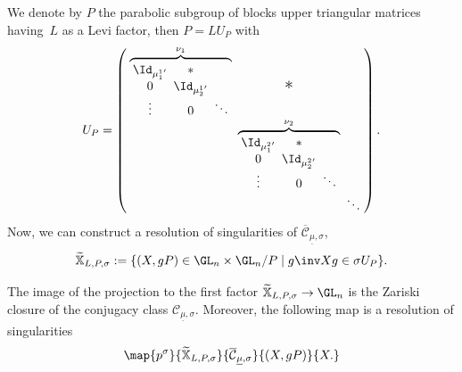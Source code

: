 We denote by $P$ the parabolic subgroup of blocks upper triangular matrices having~$L$ as a Levi factor, then $P=L U_P$ with
\[\arraycolsep2.5pt
U_P =\left(
\begin{array}{ccccc}
\overbrace{
\begin{array}{ccccc}
\Id_{{\mu^{1}_1}' } & * & \\
0 & \Id_{{\mu^{1}_2}' } & \\
\vdots & 0 & \ddots
\end{array}
}^{\nu_1} & \text{\Large{*}} & \\
& \overbrace{
\begin{array}{ccccc}
\Id_{{\mu^{2}_1}' } & * & \\
0 & \Id_{{\mu^{2}_2}' } & \\
\vdots & 0 & \ddots
\end{array}
}^{\nu_2} & \\
& & \ddots
\end{array}
\right).
\]
Now, we can construct a resolution of singularities of $\overline{\mathcal{C}}_{\underline{\mu},\sigma}$,
\[
\mathbb{\widetilde{X}}_{L,P,\sigma} :=\lbrace (X, g P) \in \GL_n \times \GL_n / P \mid g\inv X g \in \sigma U_P\rbrace.
\]
\begin{proposition}\label{prop_resol_closure}
The image of the projection to the first factor $\mathbb{\widetilde{X}}_{L,P,\sigma}\to \GL_n $ is the Zariski closure of the conjugacy class $\mathcal{C}_{\underline{\mu},\sigma}$. Moreover, the following map is a resolution of singularities
\[
\map{p^{\sigma}}{\mathbb{\widetilde{X}}_{L,P,\sigma}}{\overline{\mathcal{C}}_{\underline{\mu},\sigma}}{(X,g P)}{X.}
\]
\end{proposition}

\label{sect_resol_cc}
